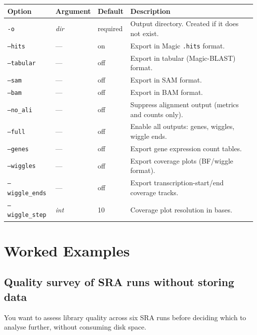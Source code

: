 \documentclass[11pt]{article}
\newcommand{\code}[1]{\texttt{#1}}
\begin{document}
\begin{center}
\begin{longtable}{p{4cm} p{2.2cm} p{2cm} p{6cm}}
\toprule
\textbf{Option} & \textbf{Argument} & \textbf{Default} & \textbf{Description} \\
\midrule
\endhead
\code{-o}             & \textit{dir}  & required & Output directory.  Created if it does not exist. \\
\code{--hits}         & ---           & on       & Export in Magic \code{.hits} format. \\
\code{--tabular}      & ---           & off      & Export in tabular (Magic-BLAST) format. \\
\code{--sam}          & ---           & off      & Export in SAM format. \\
\code{--bam}          & ---           & off      & Export in BAM format. \\
\code{--no\_ali}      & ---           & off      & Suppress alignment output (metrics and counts only). \\
\code{--full}         & ---           & off      & Enable all outputs: genes, wiggles, wiggle ends. \\
\code{--genes}        & ---           & off      & Export gene expression count tables. \\
\code{--wiggles}      & ---           & off      & Export coverage plots (BF/wiggle format). \\
\code{--wiggle\_ends} & ---           & off      & Export transcription-start/end coverage tracks. \\
\code{--wiggle\_step} & \textit{int}  & 10       & Coverage plot resolution in bases. \\
\bottomrule
\end{longtable}
\end{center}

\section{Worked Examples}

\subsection{Quality survey of SRA runs without storing data}
\label{sec:qcsurvey}

You want to assess library quality across six SRA runs before deciding
which to analyse further, without consuming disk space.
\end{document}
